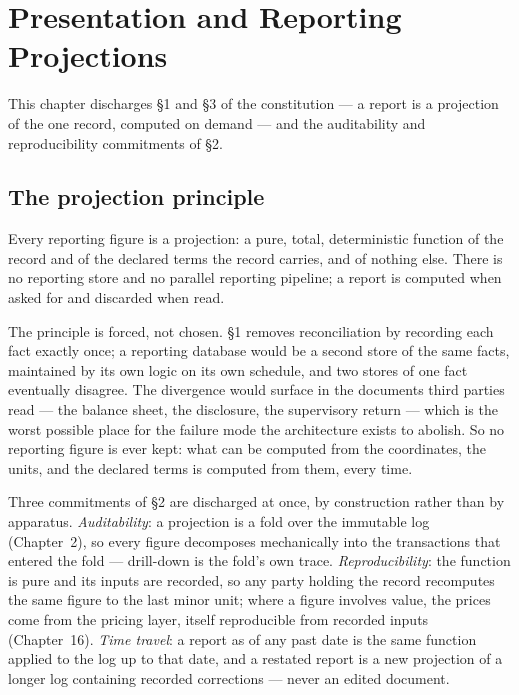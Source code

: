\section{Presentation and Reporting Projections}\label{ch:reporting}

This chapter discharges \S 1 and \S 3 of the constitution --- a report is a
projection of the one record, computed on demand --- and the auditability and
reproducibility commitments of \S 2.

\subsection{The projection principle}

Every reporting figure is a projection: a pure, total, deterministic function of
the record and of the declared terms the record carries, and of nothing else.
There is no reporting store and no parallel reporting pipeline; a report is
computed when asked for and discarded when read.

The principle is forced, not chosen. \S 1 removes reconciliation by recording
each fact exactly once; a reporting database would be a second store of the same
facts, maintained by its own logic on its own schedule, and two stores of one
fact eventually disagree. The divergence would surface in the documents third
parties read --- the balance sheet, the disclosure, the supervisory return ---
which is the worst possible place for the failure mode the architecture exists
to abolish. So no reporting figure is ever kept: what can be computed from the
coordinates, the units, and the declared terms is computed from them, every
time.

Three commitments of \S 2 are discharged at once, by construction rather than by
apparatus. \emph{Auditability}: a projection is a fold over the immutable log
(Chapter~2), so every figure decomposes mechanically into the transactions that
entered the fold --- drill-down is the fold's own trace. \emph{Reproducibility}:
the function is pure and its inputs are recorded, so any party holding the
record recomputes the same figure to the last minor unit; where a figure
involves value, the prices come from the pricing layer, itself reproducible from
recorded inputs (Chapter~16). \emph{Time travel}: a report as of any past date
is the same function applied to the log up to that date, and a restated report
is a new projection of a longer log containing recorded corrections --- never an
edited document.

